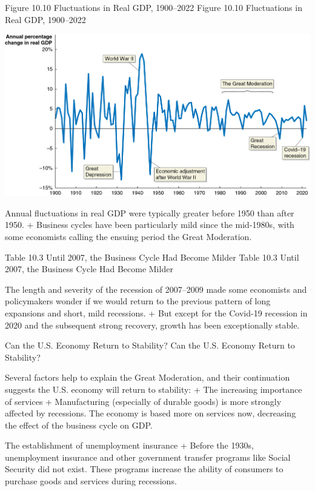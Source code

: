 \documentclass[
  12pt,
  ignorenonframetext,
]{beamer}
\begin{document}
\begin{frame}{Figure 10.10 Fluctuations in Real GDP, 1900--2022}
\label{figure-10.10-fluctuations-in-real-gdp-19002022}
Figure 10.10 Fluctuations in Real GDP, 1900--2022

\includegraphics[width=\textwidth,height=0.99\textheight]{imgs3/img_slide44a.png}

Annual fluctuations in real GDP were typically greater before 1950 than
after 1950. + Business cycles have been particularly mild since the
mid-1980s, with some economists calling the ensuing period the Great
Moderation.
\end{frame}

\begin{frame}{Table 10.3 Until 2007, the Business Cycle Had Become
Milder}
\label{table-10.3-until-2007-the-business-cycle-had-become-milder}
Table 10.3 Until 2007, the Business Cycle Had Become Milder

The length and severity of the recession of 2007--2009 made some
economists and policymakers wonder if we would return to the previous
pattern of long expansions and short, mild recessions. + But except for
the Covid-19 recession in 2020 and the subsequent strong recovery,
growth has been exceptionally stable.
\end{frame}

\begin{frame}{Can the U.S. Economy Return to Stability?}
\label{can-the-u.s.-economy-return-to-stability}
Can the U.S. Economy Return to Stability?

Several factors help to explain the Great Moderation, and their
continuation suggests the U.S. economy will return to stability: + The
increasing importance of services + Manufacturing (especially of durable
goods) is more strongly affected by recessions. The economy is based
more on services now, decreasing the effect of the business cycle on
GDP.

The establishment of unemployment insurance + Before the 1930s,
unemployment insurance and other government transfer programs like
Social Security did not exist. These programs increase the ability of
consumers to purchase goods and services during recessions.
\end{frame}
\end{document}
